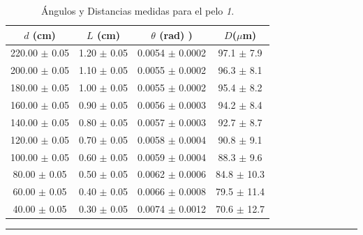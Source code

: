 \documentclass[10pt,a4paper]{article}
\begin{document}
	\begin{table}[H]
		\centering
		\begin{tabular}{|c|c|c|c|}
			\hline
			$d$ (cm) & $L$ (cm) & $\theta$ (rad) )&  $D$($\mu$m) \\ \hline
			220.00 $\pm$ 0.05  & 1.20 $\pm$ 0.05 &  0.0054 $\pm$ 0.0002  & 97.1 $\pm$ 7.9 \\
			200.00 $\pm$ 0.05  & 1.10 $\pm$ 0.05 &  0.0055 $\pm$ 0.0002  & 96.3 $\pm$ 8.1 \\
			180.00 $\pm$ 0.05  & 1.00 $\pm$ 0.05 &  0.0055 $\pm$ 0.0002 & 95.4 $\pm$ 8.2\\
			160.00 $\pm$ 0.05  & 0.90 $\pm$ 0.05 &  0.0056 $\pm$ 0.0003 & 94.2 $\pm$ 8.4 \\ 
			140.00 $\pm$ 0.05 & 0.80 $\pm$ 0.05 & 0.0057 $\pm$ 0.0003 & 92.7 $\pm$ 8.7\\ 
			120.00 $\pm$ 0.05 & 0.70 $\pm$ 0.05 & 0.0058 $\pm$ 0.0004 &  90.8 $\pm$ 9.1\\ 
			100.00 $\pm$ 0.05 & 0.60 $\pm$ 0.05 & 0.0059 $\pm$ 0.0004 & 88.3 $\pm$ 9.6\\
			80.00 $\pm$ 0.05  & 0.50 $\pm$ 0.05 &  0.0062 $\pm$ 0.0006 & 84.8 $\pm$ 10.3 \\ 
			60.00 $\pm$ 0.05 & 0.40 $\pm$ 0.05 &  0.0066 $\pm$ 0.0008 & 79.5 $\pm$ 11.4 \\
			40.00 $\pm$ 0.05 & 0.30 $\pm$ 0.05 &  0.0074 $\pm$ 0.0012 & 70.6 $\pm$ 12.7  \\ \hline
			
		\end{tabular}
		\caption{Ángulos y Distancias medidas para el pelo \textit{1}.}
		\label{tab:angulos_distancias.}
		\rule{100mm}{0.1mm}
	\end{table}
	
\end{document}
